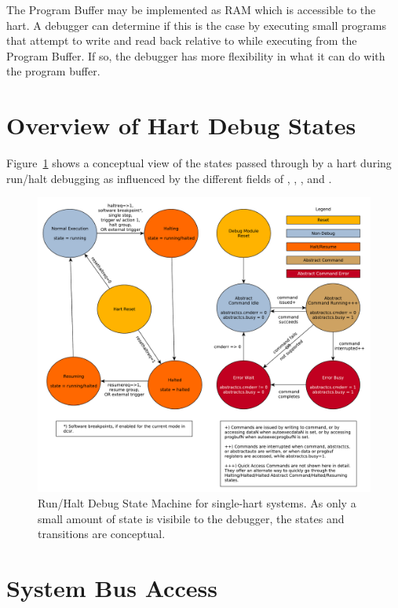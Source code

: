 The Program Buffer may be implemented as RAM which is accessible to the
hart. A debugger can determine if this is the case by executing small
programs that attempt to write and read back relative to \Rpc while executing
from the Program Buffer.
If so, the debugger has more flexibility in what it can do with the program buffer.

\section{Overview of Hart Debug States}

Figure~\ref{fig:abstract_sm} shows a conceptual view of the states
passed through by a hart during run/halt debugging as influenced
by the different fields of \RdmDmcontrol, \RdmAbstractcs, \RdmAbstractauto, and
\RdmCommand.

\begin{figure}
   \centering
   \includegraphics[width=\textwidth]{fig/abstract_commands.pdf}
   \caption[Run/Halt Debug State Machine]{Run/Halt Debug State Machine for single-hart systems.
     As only a small amount of state is visibile to the debugger,
     the states and transitions are conceptual.}
   \label{fig:abstract_sm}
\end{figure}

\section{System Bus Access} \label{systembusaccess}

